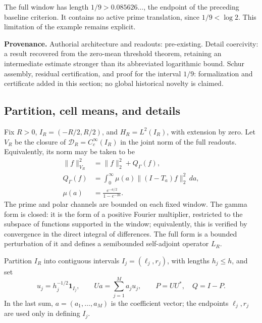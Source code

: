 The full window has length \(1/9>0.085626\ldots\), the endpoint
of the preceding baseline criterion. It contains no active prime translation,
since \(1/9<\log2\). This limitation of the example remains explicit.

\textbf{Provenance.} Authorial architecture and readouts: pre-existing. Detail
coercivity: a result recovered from the zero-mean threshold theorem, retaining an
intermediate estimate stronger than its abbreviated logarithmic bound. Schur assembly,
residual certification, and proof for the interval \(1/9\): formalization and
certificate added in this section; no global historical novelty is claimed.

\subsection{Partition, cell means, and details}
\label{viii:schur-add-sub-46}

Fix \(R>0\), \(I_R=(-R/2,R/2)\), and \(H_R=L^2(I_R)\), with extension
by zero. Let \(V_R\) be the closure of \(\mathcal D_R=C_c^\infty(I_R)\) in the
joint norm of the full readouts. Equivalently, its norm may be taken to be
\begin{equation}
\begin{aligned}
\|f\|_{V_R}^2&=\|f\|_2^2+Q_\Gamma(f),\\
Q_\Gamma(f)&=\int_0^\infty\mu(a)\|(I-T_a)f\|_2^2\,da,\\
\mu(a)&=\frac{e^{-a/2}}{1-e^{-2a}}.
\end{aligned}
\label{viii:schur-add-display-2}
\end{equation}
The prime and polar channels are bounded on each fixed window.
The gamma form is closed: it is the form of a positive Fourier
multiplier, restricted to the subspace of functions supported in the
window; equivalently, this is verified by convergence in the
direct integral of differences. The full form is a bounded perturbation
of it and defines a semibounded self-adjoint operator \(L_R\).

Partition \(I_R\) into contiguous intervals \(I_j=(\ell_j,r_j)\), with
lengths \(h_j\leq h\), and set
\begin{equation}
u_j=h_j^{-1/2}\mathbf1_{I_j},\qquad
Ua=\sum_{j=1}^M a_j u_j,\qquad P=UU^*,\quad Q=I-P.
\label{viii:schur-add-display-3}
\end{equation}
In the last sum, \(a=(a_1,\ldots,a_M)\) is the coefficient vector;
the endpoints \(\ell_j,r_j\) are used only in defining \(I_j\).

